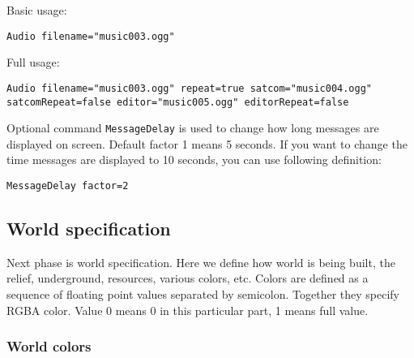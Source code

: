 Basic usage:
\begin{verbatim}
Audio filename="music003.ogg"
\end{verbatim}

Full usage:
\begin{verbatim}
Audio filename="music003.ogg" repeat=true satcom="music004.ogg" satcomRepeat=false editor="music005.ogg" editorRepeat=false
\end{verbatim}




Optional command \texttt{MessageDelay} is used to change how long messages are displayed on screen. Default factor 1 means 5 seconds. If you want to change the time messages are displayed to 10 seconds, you can use following definition:

\begin{lstlisting}[style=scene]
MessageDelay factor=2
\end{lstlisting}


\subsection{World specification}

Next phase is world specification. Here we define how world is being built, the relief, underground, resources, various colors, etc. Colors are defined as a sequence of floating point values separated by semicolon. Together they specify RGBA color. Value 0 means 0 in this particular part, 1 means full value.



\subsubsection{World colors}

